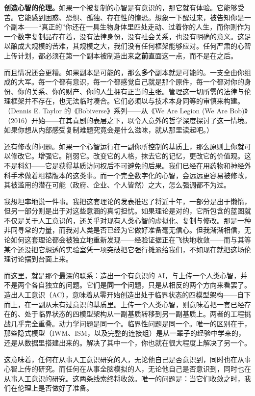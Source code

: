 \documentclass[11pt, twoside, openright]{book}
\begin{document}
\textbf{创造心智的伦理。}如果一个被复制的心智是有意识的，那它就有体验。它能够受苦。它能感到困惑、恐惧、孤独、存在性的惶恐。想象一下醒过来，被告知你是一个副本------“真正的”你还在一具生物身体里四处走动、过着你的人生，而你则作为一个数字复制品存在着，没有法律身份，没有社会关系，也没有明确的意义。这足以酿成大规模的苦难，其规模之大，我们没有任何框架能够应对。任何严肃的心智上传计划，都必须在第一个副本被制造出来\textbf{之前}直面这一点，而不是在之后。

而且情况还会更糟。如果副本是可能的，那么\textbf{多个}副本就是可能的。一支全由你组成的大军。每一个都有意识，每一个都感觉自己就是那个原件，每一个都对你的身份、你的关系、你的财产、你的人生拥有正当的主张。管理这一切所需的法律与伦理框架并不存在，也无法临时凑合。它们必须以与技术本身同等的审慎来构建。（Dennis E. Taylor 的《Bobiverse》系列------从《We Are Legion (We Are Bob)》（2016）开始------在其喜剧的表层之下，以令人意外的哲学深度探讨了这一情境。如果你想从内部感受复制难题究竟会是什么滋味，就从那里读起吧。）

还有修改的问题。如果一个心智运行在一副你所控制的基质上，那么原则上你就可以修改它。增强它。削弱它。改变它的人格，抹去它的记忆，更改它的价值观。这不是科幻------它是获得基质访问权后不可避免的后果。我们已经在用药物和神经外科手术做着粗糙版本的这类事。而一个完全数字化的心智，会远远更容易被修改，其被滥用的潜在可能（政府、企业、个人皆然）之大，怎么强调都不为过。

我想坦率地说一件事。我把这套理论的发表推迟了将近十年，一部分是出于懒惰，但另一部分则是出于对这些意涵的真切担忧。如果理论是对的，它所包含的蓝图就不仅是关于人工意识的，还关乎对现有人类心智的虚拟化、复制与修改。那是一种非同寻常的力量，而我对人类是否已经为它做好准备毫无信心。但我渐渐相信，无论如何这套理论都会被独立地重新发现------经验证据正在飞快地收敛------而与其等某个还没把它想透的实验室凭一项突破把它强行摊派给我们，不如现在就把这场伦理讨论摆到台面上来。

而这里，就是那个最深的联系：造出一个有意识的 AI，与上传一个人类心智，并不是两个各自独立的问题。它们是\textbf{同一个}问题，只是从相反的两个方向来看罢了。造出人工意识（AC），意味着从零开始创造出处于临界状态的四模型架构------自下而上，在一副从未有过意识的基质里。上传一个人类心智，则意味着把一套已经存在的、处于临界状态的四模型架构从一副基质转移到另一副基质上。两者的工程挑战几乎完全重叠。动力学问题是同一个。临界性问题是同一个。唯一的区别在于，那些隐式模型（IWM、ISM，以及完整的连接组）是从一辈子的经验中学来的，还是从数据里搭建出来的。解决了其中一个，你也就在很大程度上解决了另一个。

这意味着，任何在从事人工意识研究的人，无论他自己是否意识到，同时也在从事心智上传的研究。而任何在从事全脑模拟的人，无论他自己是否意识到，同时也在从事人工意识的研究。这两条线索终将收敛。唯一的问题是：当它们收敛之时，我们在伦理上是否做好了准备。
\end{document}
